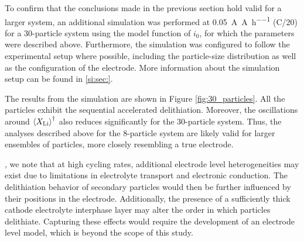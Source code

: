 \documentclass{article}
\begin{document}

To confirm that the conclusions made in the previous section hold
valid for a larger system, an additional simulation was performed at
\SI{0.05}{\ampere\per\ampere\per\hour} (C/20) for a 30-particle system
using the model function of $i_0$, for which the parameters were
described above. Furthermore, the simulation was configured to follow
the experimental setup where possible, including the particle-size
distribution as well as the configuration of the electrode. More
information about the simulation setup can be found in  \ref{si:sec:}.

The results from the simulation are shown in Figure
\ref{fig:30_particles}. All the particles exhibit the sequential
accelerated delithiation. Moreover, the oscillations around
$\left<X_{\rm{Li}}\right>^\dagger$ also reduces significantly for the
30-particle system. Thus, the analyses described above for the
8-particle system are likely valid for larger ensembles of particles,
more closely resembling a true electrode.

, we note that at high cycling rates, additional
electrode level heterogeneities may exist due to limitations in
electrolyte transport \cite{dasgupta2020} and electronic
conduction\cite{liu2019-2}. The delithiation behavior of secondary
particles would then be further influenced by their positions in the
electrode. Additionally, the presence of a sufficiently thick cathode
electrolyte interphase layer may alter the order in which particles
delithiate. Capturing these effects would require the development of
an electrode level model, which is beyond the scope of this study.

\end{document}
